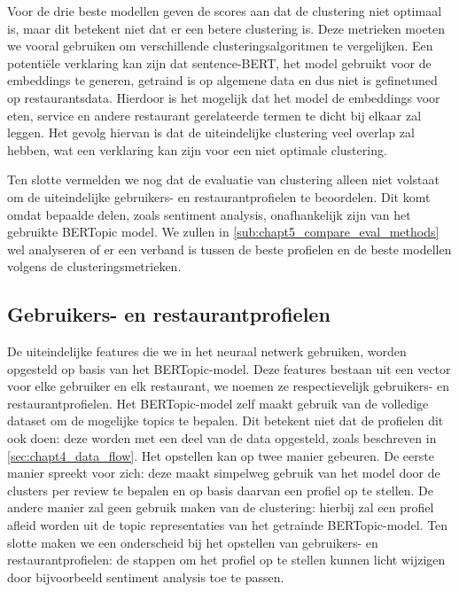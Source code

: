 Voor de drie beste modellen geven de scores aan dat de clustering niet optimaal is, maar dit betekent niet dat er een betere clustering is. Deze metrieken moeten we vooral gebruiken om verschillende clusteringsalgoritmen te vergelijken. Een potentiële verklaring kan zijn dat sentence-BERT, het model gebruikt voor de embeddings te generen, getraind is op algemene data en dus niet is gefinetuned op restaurantsdata. Hierdoor is het mogelijk dat het model de embeddings voor eten, service en andere restaurant gerelateerde termen te dicht bij elkaar zal leggen. Het gevolg hiervan is dat de uiteindelijke clustering veel overlap zal hebben, wat een verklaring kan zijn voor een niet optimale clustering.

Ten slotte vermelden we nog dat de evaluatie van clustering alleen niet volstaat om de uiteindelijke gebruikers- en restaurantprofielen te beoordelen. Dit komt omdat bepaalde delen, zoals sentiment analysis, onafhankelijk zijn van het gebruikte BERTopic model. We zullen in \autoref{sub:chapt5_compare_eval_methods} wel analyseren of er een verband is tussen de beste profielen en de beste modellen volgens de clusteringsmetrieken.


\subsection{Gebruikers- en restaurantprofielen}
\label{sec:chapt4_nlp_profielen}
De uiteindelijke features die we in het neuraal netwerk gebruiken, worden opgesteld op basis van het BERTopic-model. Deze features bestaan uit een vector voor elke gebruiker en elk restaurant, we noemen ze respectievelijk gebruikers- en restaurantprofielen. Het BERTopic-model zelf maakt gebruik van de volledige dataset om de mogelijke topics te bepalen. Dit betekent niet dat de profielen dit ook doen: deze worden met een deel van de data opgesteld, zoals beschreven in \autoref{sec:chapt4_data_flow}.\newline
Het opstellen kan op twee manier gebeuren. De eerste manier spreekt voor zich: deze maakt simpelweg gebruik van het model door de clusters per review te bepalen en op basis daarvan een profiel op te stellen. De andere manier zal geen gebruik maken van de clustering: hierbij zal een profiel afleid worden uit de topic representaties van het getrainde BERTopic-model. Ten slotte maken we een onderscheid bij het opstellen van gebruikers- en restaurantprofielen: de stappen om het profiel op te stellen kunnen licht wijzigen door bijvoorbeeld sentiment analysis toe te passen.


